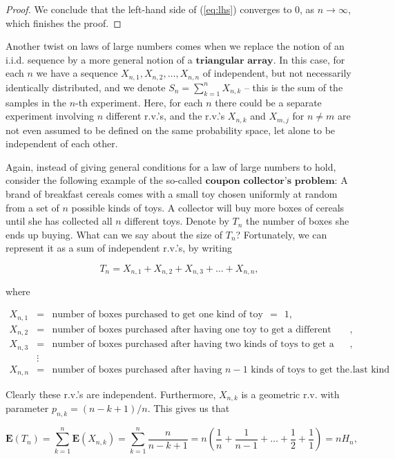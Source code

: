 \documentclass[11pt]{report}
\theoremstyle{plain}
\theoremstyle{definition}
\begin{document}
\begin{proof}
We conclude that the left-hand side of (\ref{eq:lhs})
converges to 0, as $n\to\infty$, which finishes the
proof.
\end{proof}

Another twist on laws of large numbers comes when we
replace the notion of an i.i.d. sequence by a more
general notion of a $\textbf{triangular array}$. In
this case, for each $n$ we have a sequence
$X_{n,1},X_{n,2},\ldots,X_{n,n}$ of independent, but
not necessarily identically distributed, and we denote
$S_n=\sum_{k=1}^n X_{n,k}$ -- this is the sum of the
samples in the $n$-th experiment. Here, for each $n$
there could be a separate experiment involving $n$
different r.v.'s, and the r.v.'s $X_{n,k}$ and
$X_{m,j}$ for $n\neq m$ are not even assumed to be
defined on the same probability space, let alone to be
independent of each other.

Again, instead of giving general conditions for a law
of large numbers to hold, consider the following
example of the so-called
$\textbf{coupon collector's problem}$: A brand of
breakfast cereals comes with a small toy chosen
uniformly at random from a set of $n$ possible kinds
of toys. A collector will buy more boxes of cereals
until she has collected all $n$ different toys.
Denote by $T_n$ the number of boxes she ends up
buying. What can we say about the size of $T_n$?
Fortunately, we can represent it as a sum of
independent r.v.'s, by writing

\[
T_n = X_{n,1} + X_{n,2} + X_{n,3} + \ldots + X_{n,n},
\]

where

\begin{eqnarray*}
X_{n,1} &=& \textrm{number of boxes purchased to get one kind of toy} \ \ =\ \ 1, \\
X_{n,2} &=& \textrm{number of boxes purchased after having one toy to get a different kind}, \\
X_{n,3} &=& \textrm{number of boxes purchased after having two kinds of toys to get a third kind}, \\
& \vdots&  \\
X_{n,n} &=& \textrm{number of boxes purchased after having $n-1$ kinds of toys to get the last kind}.
\end{eqnarray*}

Clearly these r.v.'s are independent. Furthermore,
$X_{n,k}$ is a geometric r.v. with parameter
$p_{n,k} = (n-k+1)/n$. This gives us that

\[
\mathbf{E}(T_n) = \sum_{k=1}^n \mathbf{E}(X_{n,k}) = \sum_{k=1}^n \frac{n}{n-k+1} = n\left(\frac{1}{n}+\frac{1}{n-1}+\ldots+\frac{1}{2}+\frac{1}{1}\right) = n H_n,
\]
\end{document}
